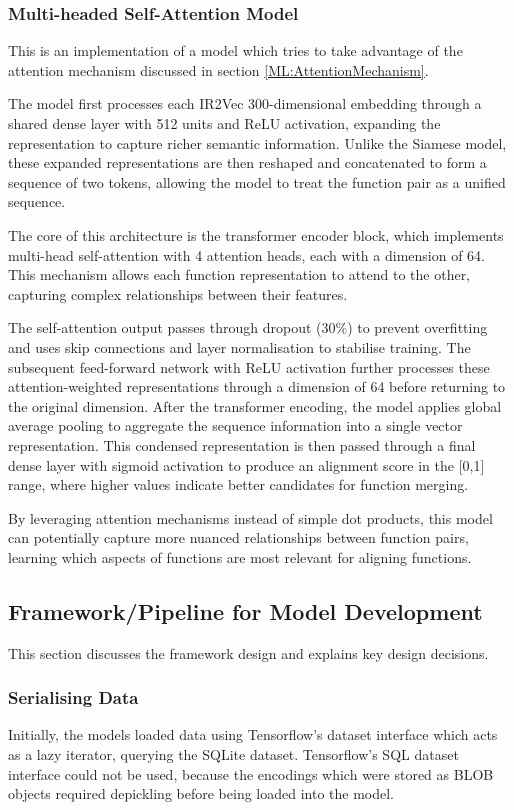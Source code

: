 \subsubsection{Multi-headed Self-Attention Model}
This is an implementation of a model which tries to take advantage of the attention mechanism discussed in section \ref{ML:AttentionMechanism}.

The model first processes each IR2Vec 300-dimensional embedding through a shared dense layer with 512 units and ReLU activation, expanding the representation to capture richer semantic information. Unlike the Siamese model, these expanded representations are then reshaped and concatenated to form a sequence of two tokens, allowing the model to treat the function pair as a unified sequence.

The core of this architecture is the transformer encoder block, which implements multi-head self-attention with 4 attention heads, each with a dimension of 64. This mechanism allows each function representation to attend to the other, capturing complex relationships between their features. 

The self-attention output passes through dropout (30\%) to prevent overfitting and uses skip connections and layer normalisation to stabilise training. The subsequent feed-forward network with ReLU activation further processes these attention-weighted representations through a dimension of 64 before returning to the original dimension. After the transformer encoding, the model applies global average pooling to aggregate the sequence information into a single vector representation. This condensed representation is then passed through a final dense layer with sigmoid activation to produce an alignment score in the [0,1] range, where higher values indicate better candidates for function merging.

By leveraging attention mechanisms instead of simple dot products, this model can potentially capture more nuanced relationships between function pairs, learning which aspects of functions are most relevant for aligning functions.


\subsection{Framework/Pipeline for Model Development}
This section discusses the framework design and explains key design decisions.

\subsubsection{Serialising Data}
Initially, the models loaded data using Tensorflow's dataset interface which acts as a lazy iterator, querying the SQLite dataset. Tensorflow's SQL dataset interface could not be used, because the encodings which were stored as BLOB objects required depickling before being loaded into the model.

